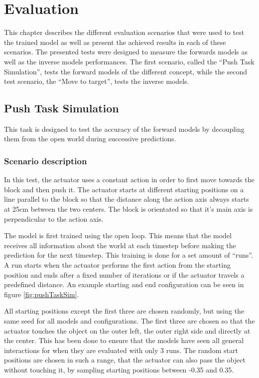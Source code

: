\chapter{Evaluation\label{chap:evaluation}}

This chapter describes the different evaluation scenarios that were used to test the trained model 
as well as present the achieved results in each of these scenarios. The presented tests were 
designed to measure the forwards models as well as the inverse models performances. The first 
scenario, called the \enquote{Push Task Simulation}, tests the forward models of the different 
concept, while the second test scenario, the \enquote{Move to target}, tests the inverse models.

\section{Push Task Simulation}

This task is designed to test the accuracy of the forward models by decoupling them from the open 
world during successive predictions. 

\subsection{Scenario description}

In this test, the actuator uses a constant action in order to first move towards the block and then push it.
The actuator starts at different starting positions on a line parallel to the block so that the distance along
the action axis always starts at 25cm between the two centers. The block is orientated so that it's main axis
is perpendicular to the action axis.

The model is first trained using the open loop. This means that the model receives all information about the
world at each timestep before making the prediction for the next timestep. This training is done for a set amount
of \enquote{runs}. A run starts when the actuator performs the first action from the starting position and ends after a fixed 
number of iterations or if the actuator travels a predefined distance.
An example starting and end configuration can be seen in figure \ref{fig:pushTaskSim}. 

All starting positions except the first three are chosen randomly, but using the
same seed for all models and configurations. %
The first three are chosen so that the actuator touches the object on the outer left, the outer right side
and directly at the center. This has been done to ensure that the models have seen all general interactions for when they are evaluated with only 3
runs. The random start positions are chosen in such a range, that the actuator can also pass the object without touching it, by sampling starting positions
between -0.35 and 0.35.

